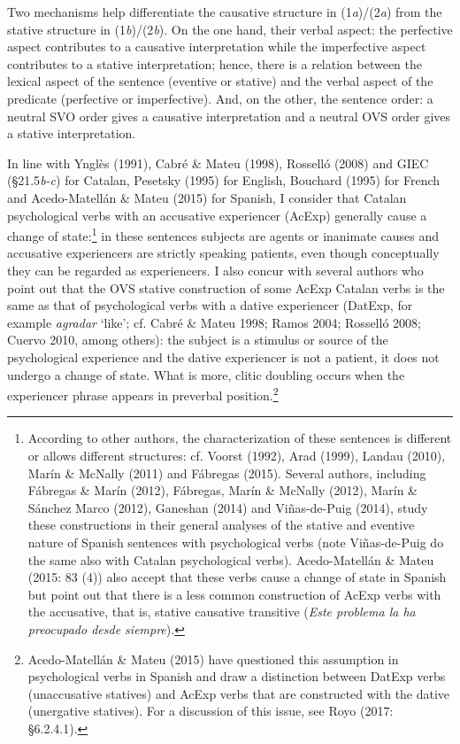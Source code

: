 \documentclass[12pt]{article}
\newenvironment{styleStandard}{\setlength\leftskip{0cm}\setlength\rightskip{0cm plus 1fil}\setlength\parindent{0cm}\setlength\parfillskip{0pt plus 1fil}\setlength\parskip{0in plus 1pt}\writerlistparindent\writerlistleftskip\leavevmode\normalfont\normalsize\writerlistlabel\ignorespaces}{\unskip\vspace{0.111in plus 0.0111in}\par}
\newcommand\writerlistleftskip{}
\newcommand\writerlistparindent{}
\newcommand\writerlistlabel{}
\begin{document}
\begin{styleStandard}
Two mechanisms help differentiate the causative structure in (1\textit{a})/(2\textit{a}) from the stative structure in (1\textit{b})/(2\textit{b}). On the one hand, their verbal aspect: the perfective aspect contributes to a causative interpretation while the imperfective aspect contributes to a stative interpretation; hence, there is a relation between the lexical aspect of the sentence (eventive or stative) and the verbal aspect of the predicate (perfective or imperfective). And, on the other, the sentence order: a neutral SVO order gives a causative interpretation and a neutral OVS order gives a stative interpretation.
\end{styleStandard}

\begin{styleStandard}
In line with Ynglès (1991), Cabré \& Mateu (1998), Rosselló (2008) and GIEC (§21.5\textit{b-c}) for Catalan, Pesetsky (1995) for English, Bouchard (1995) for French and Acedo-Matellán \& Mateu (2015) for Spanish, I consider that Catalan psychological verbs with an accusative experiencer (AcExp) generally cause a change of state:\footnote{ According to other authors, the characterization of these sentences is different or allows different structures: cf. Voorst (1992), Arad (1999), Landau (2010), Marín \& McNally (2011) and Fábregas (2015). Several authors, including Fábregas \& Marín (2012), Fábregas, Marín \& McNally (2012), Marín \& Sánchez Marco (2012), Ganeshan (2014) and Viñas-de-Puig (2014), study these constructions in their general analyses of the stative and eventive nature of Spanish sentences with psychological verbs (note Viñas-de-Puig do the same also with Catalan psychological verbs). Acedo-Matellán \& Mateu (2015: 83 (4)) also accept that these verbs cause a change of state in Spanish but point out that there is a less common construction of AcExp verbs with the accusative, that is, stative causative transitive (\textit{Este problema la ha preocupado desde siempre}).} in these sentences subjects are agents or inanimate causes and accusative experiencers are strictly speaking patients, even though conceptually they can be regarded as experiencers. I also concur with several authors who point out that the OVS stative construction of some AcExp Catalan verbs is the same as that of psychological verbs with a dative experiencer (DatExp, for example \textit{agradar} ‘like’; cf. Cabré \& Mateu 1998; Ramos 2004; Rosselló 2008; Cuervo 2010, among others): the subject is a stimulus or source of the psychological experience and the dative experiencer is not a patient, it does not undergo a change of state. What is more, clitic doubling occurs when the experiencer phrase appears in preverbal position.\footnote{ Acedo-Matellán \& Mateu (2015) have questioned this assumption in psychological verbs in Spanish and draw a distinction between DatExp verbs (unaccusative statives) and AcExp verbs that are constructed with the dative (unergative statives). For a discussion of this issue, see Royo (2017: §6.2.4.1).}
\end{styleStandard}
\end{document}

